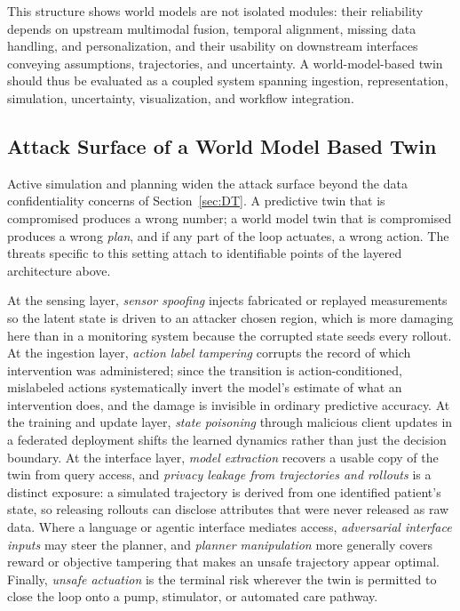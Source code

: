 \documentclass[journal]{IEEEtran}
\begin{document}
This structure shows world models are not isolated modules: their reliability depends on upstream multimodal fusion, temporal alignment, missing data handling, and personalization, and their usability on downstream interfaces conveying assumptions, trajectories, and uncertainty. A world-model-based twin should thus be evaluated as a coupled system spanning ingestion, representation, simulation, uncertainty, visualization, and workflow integration.

\subsection{Attack Surface of a World Model Based Twin}
Active simulation and planning widen the attack surface beyond the data confidentiality concerns of Section~\ref{sec:DT}. A predictive twin that is compromised produces a wrong number; a world model twin that is compromised produces a wrong \emph{plan}, and if any part of the loop actuates, a wrong action. The threats specific to this setting attach to identifiable points of the layered architecture above.

At the sensing layer, \emph{sensor spoofing} injects fabricated or replayed measurements so the latent state is driven to an attacker chosen region, which is more damaging here than in a monitoring system because the corrupted state seeds every rollout. At the ingestion layer, \emph{action label tampering} corrupts the record of which intervention was administered; since the transition is action-conditioned, mislabeled actions systematically invert the model's estimate of what an intervention does, and the damage is invisible in ordinary predictive accuracy. At the training and update layer, \emph{state poisoning} through malicious client updates in a federated deployment shifts the learned dynamics rather than just the decision boundary. At the interface layer, \emph{model extraction} recovers a usable copy of the twin from query access, and \emph{privacy leakage from trajectories and rollouts} is a distinct exposure: a simulated trajectory is derived from one identified patient's state, so releasing rollouts can disclose attributes that were never released as raw data. Where a language or agentic interface mediates access, \emph{adversarial interface inputs} may steer the planner, and \emph{planner manipulation} more generally covers reward or objective tampering that makes an unsafe trajectory appear optimal. Finally, \emph{unsafe actuation} is the terminal risk wherever the twin is permitted to close the loop onto a pump, stimulator, or automated care pathway.
\end{document}

